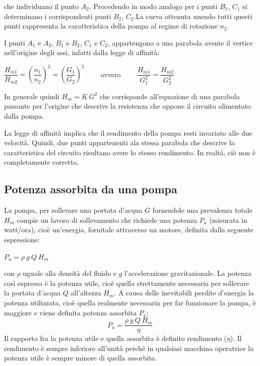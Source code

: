 \documentclass[laurea,oneside,11pt]{USiena_tesiLM}
\begin{document}
che individuano il punto $A_2$. Procedendo in modo analogo per i punti $B_1$, $C_1$ si determinano i corrispondenti punti $B_2$, $C_2$.La curva ottenuta unendo tutti questi punti rappresenta la caratteristica della pompa al regime di rotazione $n_2$.

I punti $A_1$ e $A_2$, $B_1$ e $B_2$, $C_1$ e $C_2$, appartengono a una parabola avente il vertice nell'origine degli assi, infatti dalla legge di affinità:
\begin{center}
$\dfrac{H_{m1}}{H_{m2}}=\left(\dfrac{n_1}{n_2} \right)^2 = \left(\dfrac{G_1}{G_2} \right)^2  \qquad$ ovvero   $\qquad \dfrac{H_{m1}}{G_1^2}=\dfrac{H_{m2}}{G_2^2}$ 
\end{center}
In generale quindi $H_m = K \ G^2$ che corrisponde all'equazione di una parabola passante per l'origine che descrive la resistenza che oppone il circuito alimentato dalla pompa.

La legge di affinità implica che il rendimento della pompa resti invariato alle due velocità. Quindi, due punti appartenenti ala stessa parabola che descrive la caratteristica del circuito risultano avere lo stesso rendimento. In realtà, ciò non è completamente corretto.


\subsection{Potenza assorbita da una pompa}
La pompa, per sollevare una portata d'acqua $G$ fornendole una prevalenza totale $H_m$ compie un lavoro di sollevamento che richiede una potenza $P_u$ (misurata in watt/ora), cioè un'energia, fornitale attraverso un motore, definita dalla seguente espressione:
\begin{center}
$P_u = \rho \ g \ Q \ H_m$
\end{center}
con $\rho$ uguale alla densità del fluido e $g$ l'accelerazione gravitazionale.
La potenza così espressa è la potenza utile, cioè quella strettamente necessaria per sollevare la portata d'acqua $Q$ all'altezza $H_m$. A causa delle inevitabili perdite d'energia la potenza utilizzata, cioè quella realmente necessaria per far funzionare la pompa, è maggiore e viene definita potenza assorbita $P_a$:
\begin{equation}
P_a = \dfrac{\rho \ g \ Q \ H_m}{\eta}
\end{equation}
Il rapporto fra la potenza utile e quella assorbita è definito rendimento ($\eta$). Il rendimento è sempre inferiore all'unità perché in qualsiasi macchina operatrice la potenza utile è sempre minore di quella assorbita. 
\end{document}
